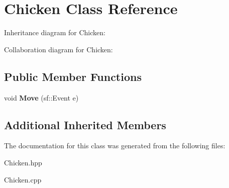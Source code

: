 \hypertarget{classChicken}{}\section{Chicken Class Reference}
\label{classChicken}


Inheritance diagram for Chicken\+:


Collaboration diagram for Chicken\+:
\subsection*{Public Member Functions}
\begin{DoxyCompactItemize}
\item 
\mbox{\label{classChicken_a3b2c66d3505c4bc711a9dccfe08143f4}} 
void {\bfseries Move} (sf\+::\+Event e)
\end{DoxyCompactItemize}
\subsection*{Additional Inherited Members}


The documentation for this class was generated from the following files\+:\begin{DoxyCompactItemize}
\item 
Chicken.\+hpp\item 
Chicken.\+cpp\end{DoxyCompactItemize}
